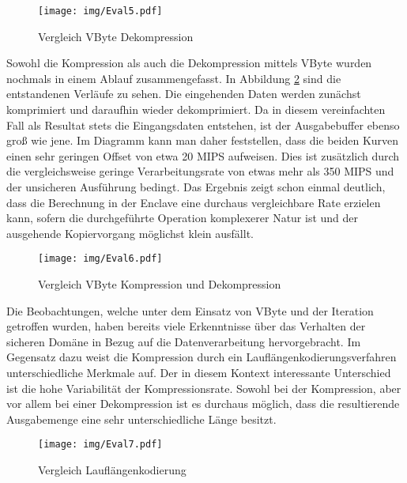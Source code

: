 \begin{figure}[H]
	\texttt{[image: img/Eval5.pdf]}
	\centering
	\caption{Vergleich VByte Dekompression}
	\label{fig:eval5}
\end{figure}

Sowohl die Kompression als auch die Dekompression mittels VByte wurden nochmals in einem Ablauf zusammengefasst. In Abbildung \ref{fig:eval6} sind die entstandenen Verläufe zu sehen. Die eingehenden Daten werden zunächst komprimiert und daraufhin wieder dekomprimiert. Da in diesem vereinfachten Fall als Resultat stets die Eingangsdaten entstehen, ist der Ausgabebuffer ebenso groß wie jene. Im Diagramm kann man daher feststellen, dass die beiden Kurven einen sehr geringen Offset von etwa 20 \ac{MIPS} aufweisen. Dies ist zusätzlich durch die vergleichsweise geringe Verarbeitungsrate von etwas mehr als 350 \ac{MIPS} und der unsicheren Ausführung bedingt. Das Ergebnis zeigt schon einmal deutlich, dass die Berechnung in der Enclave eine durchaus vergleichbare Rate erzielen kann, sofern die durchgeführte Operation komplexerer Natur ist und der ausgehende Kopiervorgang möglichst klein ausfällt.

\begin{figure}[H]
	\texttt{[image: img/Eval6.pdf]}
	\centering
	\caption{Vergleich VByte Kompression und Dekompression}
	\label{fig:eval6}
\end{figure}

Die Beobachtungen, welche unter dem Einsatz von VByte und der Iteration getroffen wurden, haben bereits viele Erkenntnisse über das Verhalten der sicheren Domäne in Bezug auf die Datenverarbeitung hervorgebracht. Im Gegensatz dazu weist die Kompression durch ein Lauflängenkodierungsverfahren unterschiedliche Merkmale auf. Der in diesem Kontext interessante Unterschied ist die hohe Variabilität der Kompressionsrate. Sowohl bei der Kompression, aber vor allem bei einer Dekompression ist es durchaus möglich, dass die resultierende Ausgabemenge eine sehr unterschiedliche Länge besitzt.

\begin{figure}[H]
	\texttt{[image: img/Eval7.pdf]}
	\centering
	\caption{Vergleich Lauflängenkodierung}
	\label{fig:eval7}
\end{figure}

